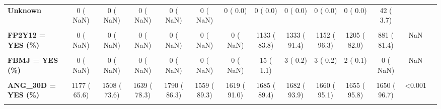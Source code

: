 \documentclass[
]{article}
\begin{document}
\begin{table}[H]
\begin{tabular}[t]{>{\raggedright\arraybackslash}p{5em}ccccccccccccc}
\textbf{Unknown} & 0 (  NaN) & 0 (  NaN) & 0 (  NaN) & 0 (  NaN) & 0 (  NaN) & 0 (  0.0) & 0 (  0.0) & 0 (  0.0) & 0 (  0.0) & 0 (  0.0) & 42 (  3.7) &  & \\
\textbf{\cellcolor{gray!10}{YES}} & \cellcolor{gray!10}{0 (  NaN)} & \cellcolor{gray!10}{0 (  NaN)} & \cellcolor{gray!10}{0 (  NaN)} & \cellcolor{gray!10}{0 (  NaN)} & \cellcolor{gray!10}{0 (  NaN)} & \cellcolor{gray!10}{68 (  4.1)} & \cellcolor{gray!10}{6 (  0.4)} & \cellcolor{gray!10}{6 (  0.6)} & \cellcolor{gray!10}{8 (  1.3)} & \cellcolor{gray!10}{1 (  0.1)} & \cellcolor{gray!10}{5 (  0.4)} & \cellcolor{gray!10}{} & \cellcolor{gray!10}{}\\
\textbf{FP2Y12 = YES (\%)} & 0 (  NaN) & 0 (  NaN) & 0 (  NaN) & 0 (  NaN) & 0 (  NaN) & 0 (  NaN) & 1133 ( 83.8) & 1333 ( 91.4) & 1152 ( 96.3) & 1205 ( 82.0) & 881 ( 81.4) & NaN & \\
\textbf{\cellcolor{gray!10}{Act\_Can = YES (\%)}} & \cellcolor{gray!10}{0 (  NaN)} & \cellcolor{gray!10}{0 (  NaN)} & \cellcolor{gray!10}{0 (  NaN)} & \cellcolor{gray!10}{0 (  NaN)} & \cellcolor{gray!10}{0 (  NaN)} & \cellcolor{gray!10}{0 (  NaN)} & \cellcolor{gray!10}{0 (  NaN)} & \cellcolor{gray!10}{26 (  1.5)} & \cellcolor{gray!10}{38 (  2.2)} & \cellcolor{gray!10}{26 (  1.5)} & \cellcolor{gray!10}{0 (  NaN)} & \cellcolor{gray!10}{NaN} & \cellcolor{gray!10}{}\\
\textbf{FBMJ = YES (\%)} & 0 (  NaN) & 0 (  NaN) & 0 (  NaN) & 0 (  NaN) & 0 (  NaN) & 0 (  NaN) & 15 (  1.1) & 3 (  0.2) & 3 (  0.2) & 2 (  0.1) & 0 (  NaN) & NaN & \\
\textbf{\cellcolor{gray!10}{FBMN = YES (\%)}} & \cellcolor{gray!10}{0 (  NaN)} & \cellcolor{gray!10}{0 (  NaN)} & \cellcolor{gray!10}{0 (  NaN)} & \cellcolor{gray!10}{0 (  NaN)} & \cellcolor{gray!10}{0 (  NaN)} & \cellcolor{gray!10}{0 (  NaN)} & \cellcolor{gray!10}{11 (  0.8)} & \cellcolor{gray!10}{9 (  0.6)} & \cellcolor{gray!10}{10 (  0.7)} & \cellcolor{gray!10}{7 (  0.5)} & \cellcolor{gray!10}{0 (  NaN)} & \cellcolor{gray!10}{NaN} & \cellcolor{gray!10}{}\\
\textbf{ANG\_30D = YES (\%)} & 1177 ( 65.6) & 1508 ( 73.6) & 1639 ( 78.3) & 1790 ( 86.3) & 1559 ( 89.3) & 1619 ( 91.0) & 1685 ( 89.4) & 1682 ( 93.9) & 1660 ( 95.1) & 1655 ( 95.8) & 1650 ( 96.7) & <0.001 & \\
\textbf{\cellcolor{gray!10}{PCI\_30D = YES (\%)}} & \cellcolor{gray!10}{758 ( 42.3)} & \cellcolor{gray!10}{1069 ( 52.2)} & \cellcolor{gray!10}{1236 ( 59.0)} & \cellcolor{gray!10}{1365 ( 65.8)} & \cellcolor{gray!10}{1224 ( 70.1)} & \cellcolor{gray!10}{1289 ( 72.5)} & \cellcolor{gray!10}{1312 ( 69.6)} & \cellcolor{gray!10}{1302 ( 72.7)} & \cellcolor{gray!10}{1145 ( 70.0)} & \cellcolor{gray!10}{1388 ( 83.0)} & \cellcolor{gray!10}{1368 ( 86.9)} & \cellcolor{gray!10}{<0.001} & \cellcolor{gray!10}{}\\
\bottomrule
\end{tabular}
\end{table}
\end{document}
